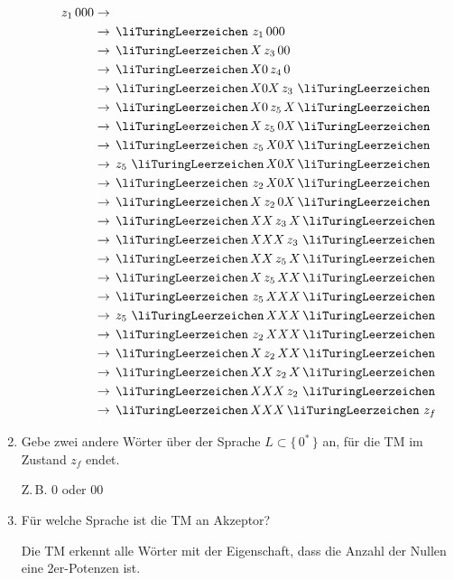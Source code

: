 \documentclass{lehramt-informatik-aufgabe}
\begin{document}
\begin{enumerate}
\begin{itemize}
\begin{liAntwort}
\begin{align*}
\z1 000 \p \\
\p \l \z1 000 \\
\p \l X\z3 00 \\
\p \l X0\z4 0 \\
\p \l X0X\z3 \l \\
\p \l X0\z5 X\l \\
\p \l X\z5 0X\l \\
\p \l \z5 X0X\l \\
\p \z5 \l X0X\l \\
\p \l \z2 X0X\l \\
\p \l X\z2 0X\l \\
\p \l XX\z3 X\l \\
\p \l XXX\z3 \l \\
\p \l XX\z5 X\l \\
\p \l X\z5 XX\l \\
\p \l \z5 XXX\l \\
\p \z5 \l XXX\l \\
\p \l \z2 XXX\l \\
\p \l X\z2 XX\l \\
\p \l XX\z2 X\l \\
\p \l XXX\z2 \l \\
\p \l XXX\l \z f
\end{align*}
\end{liAntwort}

\end{itemize}


\item Gebe zwei andere Wörter über der Sprache $L \subset \{ \, 0^* \,
\}$ an, für die TM im Zustand $z_f$ endet.

\begin{liAntwort}
Z.\,B. $0$ oder $00$
\end{liAntwort}


\item Für welche Sprache ist die TM an Akzeptor?

\begin{liAntwort}
Die TM erkennt alle Wörter mit der Eigenschaft, dass die Anzahl der
Nullen eine 2er-Potenzen ist.
\end{liAntwort}
\end{enumerate}
\end{document}
